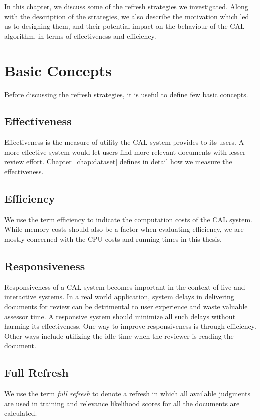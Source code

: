\label{chap:refresh}
In this chapter, we discuss some of the refresh strategies we investigated.
Along with the description of the strategies, we also describe the motivation
which led us to designing them, and their potential impact on the behaviour of
the CAL algorithm, in terms of effectiveness and efficiency.

\section{Basic Concepts}
Before discussing the refresh strategies, it is useful to define few basic
concepts.
\subsection*{Effectiveness}
Effectiveness is the measure of utility the CAL system provides to its users. A
more effective system would let users find more relevant documents with lesser
review effort.  Chapter~\ref{chap:dataset} defines in detail how we measure the
effectiveness.

\subsection*{Efficiency}
We use the term efficiency to indicate the computation costs of the CAL system.
While memory costs should also be a factor when evaluating efficiency, we are
mostly concerned with the CPU costs and running times in this thesis.

\subsection*{Responsiveness}
Responsiveness of a CAL system becomes important in the context of live and
interactive systems. In a real world application, system delays in delivering
documents for review can be detrimental to user experience and waste valuable
assessor time. A responsive system should minimize all such delays without
harming its effectiveness. One way to improve responsiveness is through
efficiency.  Other ways include utilizing the idle time when the reviewer is
reading the document.

\subsection*{Full Refresh}
We use the term \textit{full refresh} to denote a refresh in which all
available judgments are used in training and relevance likelihood scores for all
the documents are calculated.

